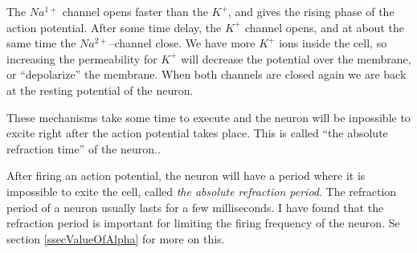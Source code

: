 The $Na^{1+}$ channel opens faster than the $K^+$, and gives the rising phase of the action potential.
After some time delay, the $K^+$ channel opens, and at about the same time the $Na^{2+}$--channel close.
We have more $K^+$ ions inside the cell, so increasing the permeability for $K^+$ will decrease the potential over the membrane, or ``depolarize'' the membrane.
When both channels are closed again we are back at the resting potential of the neuron. %

These mechanisms take some time to execute and the neuron will be inpossible to excite right after the action potential takes place.
This is called ``the absolute refraction time'' of the neuron..


After firing an action potential, the neuron will have a period where it is impossible to exite the cell, called \emph{the absolute refraction period}. 
The refraction period of a neuron usually lasts for a few milliseconds.
I have found that the refraction period is important for limiting the firing frequency of the neuron. Se section \ref{ssecValueOfAlpha} for more on this.










